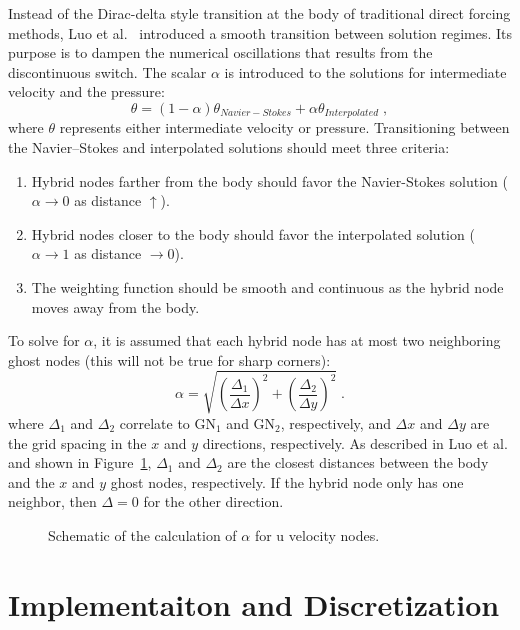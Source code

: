 Instead of the Dirac-delta style transition at the body of traditional direct forcing methods, Luo et al.~\cite{Luo:2012gx} introduced a smooth transition between solution regimes.
Its purpose is to dampen the numerical oscillations that results from the discontinuous switch. 
The scalar $\alpha$ is introduced to the solutions for intermediate velocity and the pressure:
\begin{equation}\label{eq:Weight}
\theta = \left(1-\alpha \right)\theta_{Navier-Stokes} + \alpha \theta_{Interpolated} \;,
\end{equation}
where $\theta$ represents either intermediate velocity or pressure.
Transitioning between the Navier--Stokes and interpolated solutions should meet three criteria:
\begin{enumerate}
	\item Hybrid nodes farther from the body should favor the Navier-Stokes solution ($\alpha \rightarrow 0$ as distance $\uparrow$).
	\item Hybrid nodes closer to the body should favor the interpolated solution ($\alpha \rightarrow 1$ as distance $ \rightarrow 0$).
	\item The weighting function should be smooth and continuous as the hybrid node moves away from the body.
\end{enumerate}
To solve for $\alpha$, it is assumed that each hybrid node has at most two neighboring ghost nodes (this will not be true for sharp corners):
\begin{equation}
\alpha = \sqrt{\left(\frac{\Delta_1}{\Delta x}\right)^2 + \left(\frac{\Delta_2}{\Delta y}\right)^2} \;.
\label{eq:Alpha}
\end{equation}
where $\Delta_1$ and $\Delta_2$ correlate to GN$_1$ and GN$_2$, respectively, and $\Delta x$ and $\Delta y$ are the grid spacing in the $x$ and $y$ directions, respectively. 
As described in Luo et al. and shown in Figure~\ref{fig:Weight}, $\Delta_1$ and $\Delta_2$ are the closest distances between the body and the $x$ and $y$ ghost nodes, respectively. 
If the hybrid node only has one neighbor, then $\Delta=0$ for the other direction. 
\begin{figure}[htb]
	\centering
	
	\caption{Schematic of the calculation of $\alpha$ for u velocity nodes.}
	\label{fig:Weight}
\end{figure}

\chapter{Implementaiton and Discretization}\label{chapter:Implementation}

